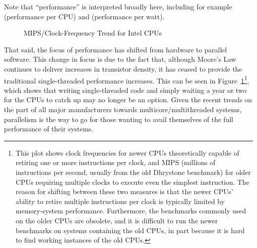 \QuickQuizEnd

Note that ``performance'' is interpreted broadly here,
including for example  (performance per CPU) and 
(performance per watt).

\begin{figure}
\centering
{}
\caption{MIPS/Clock-Frequency Trend for Intel CPUs}
\label{fig:intro:Clock-Frequency Trend for Intel CPUs}
\end{figure}

That said, the focus of performance has shifted from hardware to
parallel software.
This change in focus is due to the fact that, although Moore's Law
continues to deliver increases in transistor density, it has ceased to
provide the traditional single-threaded performance increases.
This can be seen in
Figure~\ref{fig:intro:Clock-Frequency Trend for Intel CPUs}\footnote{
	This plot shows clock frequencies for newer CPUs theoretically
	capable of retiring one or more instructions per clock, and MIPS
	(millions of instructions per second, usually from the old
	Dhrystone benchmark)
	for older CPUs requiring multiple clocks to execute even the
	simplest instruction.
	The reason for shifting between these two measures is that the
	newer CPUs' ability to retire multiple instructions per clock is
	typically limited by memory-system performance.
	Furthermore, the benchmarks commonly used on the older CPUs
	are obsolete, and it is difficult to run the newer benchmarks
	on systems containing the old CPUs, in part because it is hard
	to find working instances of the old CPUs.},
which shows that writing single-threaded code and simply waiting
a year or two for the CPUs to catch up may no longer be an option.
Given the recent trends on the part of all major manufacturers towards
multicore/multithreaded systems, parallelism is the way to go for
those wanting to avail themselves of the full performance of their
systems.

